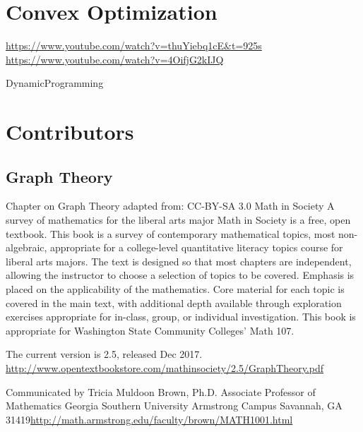 \documentclass[letter,12pt]{book}
\renewcommand{\0}{\mathbf{0}}
\begin{document}
\section{Convex Optimization}
\url{https://www.youtube.com/watch?v=thuYiebq1cE&t=925s}
\url{https://www.youtube.com/watch?v=4OifjG2kIJQ}

{DynamicProgramming}

\section{Contributors}
	
	\cleardoublepage

	
	
	\cleardoublepage

\subsection{Graph Theory}
Chapter on Graph Theory adapted from: 
CC-BY-SA 3.0
Math in Society
A survey of mathematics for the liberal arts major
Math in Society is a free, open textbook. This book is a survey of contemporary mathematical topics, most non-algebraic, appropriate for a college-level quantitative literacy topics course for liberal arts majors. The text is designed so that most chapters are independent, allowing the instructor to choose a selection of topics to be covered. Emphasis is placed on the applicability of the mathematics. Core material for each topic is covered in the main text, with additional depth available through exploration exercises appropriate for in-class, group, or individual investigation. This book is appropriate for Washington State Community Colleges' Math 107.

The current version is 2.5, released Dec 2017.
\url{http://www.opentextbookstore.com/mathinsociety/2.5/GraphTheory.pdf}

Communicated by 
Tricia Muldoon Brown, Ph.D.
Associate Professor of Mathematics
Georgia Southern University
Armstrong Campus
Savannah, GA 31419\url{http://math.armstrong.edu/faculty/brown/MATH1001.html}


%

	\cleardoublepage
	\printindex

%	
\end{document}
